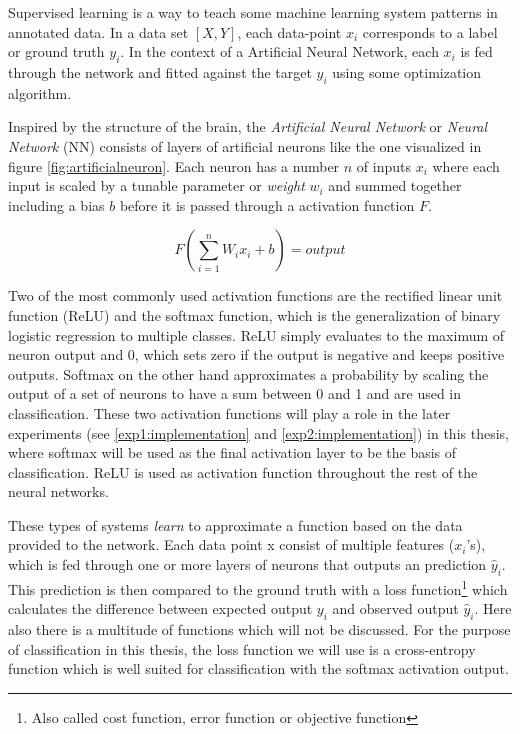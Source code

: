 Supervised learning is a way to teach some machine learning system patterns in annotated data. In a data set \(\left [X, Y \right] \), each data-point \(x_{i}\) corresponds to a label or ground truth \(y_{i}\). In the context of a Artificial Neural Network, each \(x_{i}\) is fed through the network and fitted against the target \(y_{i}\) using some optimization algorithm. 

Inspired by the structure of the brain, the \textit{Artificial Neural Network} or \textit{Neural Network} (NN) consists of layers of artificial neurons like the one visualized in figure \ref{fig:artificialneuron}. Each neuron has a number \(n\) of inputs \(x_{i}\) where each input is scaled by a tunable parameter or \textit{weight} \(w_{i}\) and summed together including a bias \(b\) before it is passed through a activation function \(F\).

\begin{equation}
    F(\sum_{i=1}^{n}W_{i}x_{i} + b) = output
\end{equation}

Two of the most commonly used activation functions are the rectified linear unit function (ReLU) and the softmax function, which is the generalization of binary logistic regression to multiple classes. ReLU simply evaluates to the maximum of neuron output and 0, which sets zero if the output is negative and keeps positive outputs. Softmax on the other hand approximates a probability by scaling the output of a set of neurons to have a sum between 0 and 1 and are used in classification. These two activation functions will play a role in the later experiments (see \ref{exp1:implementation} and \ref{exp2:implementation}) in this thesis, where softmax will be used as the final activation layer to be the basis of classification. ReLU is used as activation function throughout the rest of the neural networks. 

These types of systems \textit{learn} to approximate a function based on the data provided to the network. Each data point x consist of multiple features (\(x_{i}\)'s), which is fed through one or more layers of neurons that outputs an prediction \(\hat{y}_{i}\). This prediction is then compared to the ground truth with a loss function\footnote{Also called cost function, error function or objective function} which calculates the difference between expected output \(y_{i}\) and observed output \(\hat{y}_{i}\). Here also there is a multitude of functions which will not be discussed. For the purpose of classification in this thesis, the loss function we will use is a cross-entropy function which is well suited for classification with the softmax activation output\cite{softmaxcrossentropy}.


